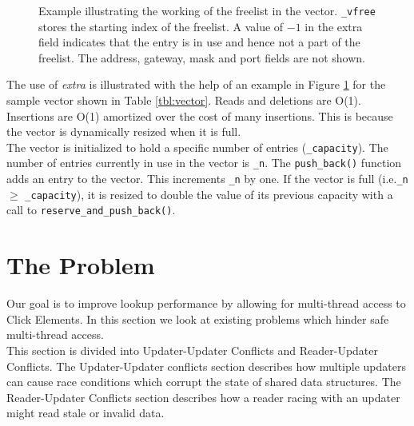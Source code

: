 \documentclass[a4paper]{article}
\begin{document}
\begin{figure}[tph]
\begin{center}
\begin{tabular}{|p{2.5in} c|}
\hline
\end{tabular}
\cprotect\caption{Example illustrating the working of the freelist in the vector. \verb+_vfree+ stores the starting index of the freelist. A value of $-1$ in the extra field indicates that the entry is in use and hence not a part of the freelist. The address, gateway, mask and port fields are not shown.}
\label{fig:freelisteg}
\end{center}
\end{figure}


The use of \emph{extra} is illustrated with the help of an example in Figure \ref{fig:freelisteg} for the sample vector shown in Table \ref{tbl:vector}. Reads and deletions are O(1). Insertions are O(1) amortized over the cost of many insertions. This is because the vector is dynamically resized when it is full.\\

The vector is initialized to hold a specific number of entries (\verb+_capacity+). The number of entries currently in use in the vector is \verb+_n+. The \verb+push_back()+ function adds an entry to the vector. This increments \verb$_n$ by one. If the vector is full (i.e.\verb+_n+ $\ge$ \verb+_capacity+), it is resized to double the value of its previous capacity with a call to \verb+reserve_and_push_back()+.

\section{The Problem}
\label{sec:problem}
Our goal is to improve lookup performance by allowing for multi-thread
access to Click Elements. In this section we look at existing problems
which hinder safe multi-thread access.\\

This section is divided into Updater-Updater Conflicts and
Reader-Updater Conflicts. The Updater-Updater conflicts section
describes how multiple updaters can cause race conditions which
corrupt the state of shared data structures. The Reader-Updater
Conflicts section describes how a reader racing with an updater might
read stale or invalid data.
\end{document}
